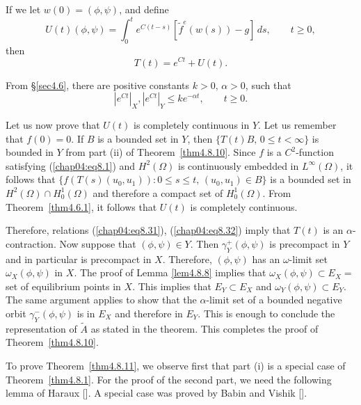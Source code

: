 \documentclass{surv-l}
\theoremstyle{plain}
\theoremstyle{definition}
\numberwithin{equation}{section}
\numberwithin{figure}{chapter}
\begin{document}
If we let $w(0)=(\phi, \psi)$, and define
\begin{equation}\label{chap04:eq8.30}
U(t)(\phi, \psi)=\int_{0}^{t}e^{C(t-s)}[\tilde{f}^{e}(w(s))-g]\,ds,\qquad t\geq 0,
\end{equation}
then
\begin{equation}\label{chap04:eq8.31}
T(t)=e^{Ct}+U(t).
\end{equation}

From \S\ref{sec4.6}, there are positive constants $k>0,\,\alpha >0$, such that
\begin{equation}\label{chap04:eq8.32}
|e^{Ct}|_{X},|e^{Ct}|_{Y}\leq ke^{-\alpha t},\qquad t\geq 0.
\end{equation}

Let us now prove that $U(t)$ is completely continuous in $Y$. Let us remember that $f(0)=0$. If $B$ is a bounded set in $Y$, then $\{T(t)B,\, 0\leq t<\infty\}$ is bounded in $Y$ from part (ii) of Theorem~\ref{thm4.8.10}. Since $f$ is a $C^{2}$-function satisfying (\ref{chap04:eq8.1}) and $H^{2}(\Omega)$ is continuously embedded in $L^{\infty}(\Omega)$, it follows that $\{f(T(s)(u_{0}, u_{1}))\!:0\leq s \leq t,\,(u_{0}, u_{1})\in B\}$ is a bounded set in $H^{2}(\Omega)\cap H_{0}^{1}(\Omega)$ and therefore a compact set of $H_{0}^{1}(\Omega)$. From Theorem~\ref{thm4.6.1}, it follows that $U(t)$ is completely continuous.

Therefore, relations (\ref{chap04:eq8.31}), (\ref{chap04:eq8.32}) imply that $T(t)$ is an $\alpha$-contraction. Now suppose that $(\phi, \psi)\in Y$. Then $\gamma_{Y}^{+}(\phi, \psi)$ is precompact in $Y$ and in particular is precompact in $X$. Therefore, $(\phi, \psi)$ has an $\omega$-limit set $\omega_{X}(\phi, \psi)$ in $X$. The proof of Lemma \ref{lem4.8.8} implies that $\omega_{X}(\phi, \psi)\subset E_{X}=$ set of equilibrium points in $X$. This implies that $E_{Y}\subset E_{X}$ and $\omega_{Y}(\phi, \psi)\subset E_{Y}$. The same argument applies to show that the $\alpha$-limit set of a bounded negative orbit $\gamma_{Y}^{-}(\phi, \psi)$ is in $E_{X}$ and therefore in $E_{Y}$. This is enough to conclude the representation of $\tilde{A}$ as stated in the theorem. This completes the proof of Theorem~\ref{thm4.8.10}.

To prove Theorem~\ref{thm4.8.11}, we observe first that part (i) is a special case of Theorem~\ref{thm4.8.1}. For the proof of the second part, we need the following lemma of Haraux [\citeyear{1985haraux}]. A special case was proved by Babin and Vishik [\citeyear{1983bv}].
\end{document}
